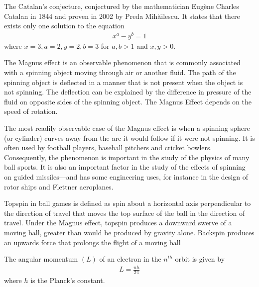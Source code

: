 \begin{mathbox}{}
{The Catalan's conjecture, conjectured by the mathematician Eugène Charles Catalan in 1844 and proven in 2002 by Preda Mihăilescu. It states that there  exists only one solution to the equation
\begin{align*} 
    x^a - y^b = 1
\end{align*} 
where $x=3, a=2, y=2, b=3$ for {$a,b > 1$} and {$x,y > 0$}.}
\end{mathbox}
\begin{phybox}{}
    {The Magnus effect is an observable phenomenon that is commonly associated with a spinning object moving through air or another fluid. The path of the spinning object is deflected in a manner that is not present when the object is not spinning. The deflection can be explained by the difference in pressure of the fluid on opposite sides of the spinning object. The Magnus Effect depends on the speed of rotation.

    The most readily observable case of the Magnus effect is when a spinning sphere (or cylinder) curves away from the arc it would follow if it were not spinning. It is often used by football players, baseball pitchers and cricket bowlers. Consequently, the phenomenon is important in the study of the physics of many ball sports. It is also an important factor in the study of the effects of spinning on guided missiles—and has some engineering uses, for instance in the design of rotor ships and Flettner aeroplanes.
    
    Topspin in ball games is defined as spin about a horizontal axis perpendicular to the direction of travel that moves the top surface of the ball in the direction of travel. Under the Magnus effect, topspin produces a downward swerve of a moving ball, greater than would be produced by gravity alone. Backspin produces an upwards force that prolongs the flight of a moving ball}
\end{phybox}
\begin{phybox}{}
{The {angular momentum} $(L)$ of an {electron} in the $n^{th}$ orbit is given by 
\begin{align*} 
    L = \frac{nh}{2\pi} 
\end{align*} where $h$ is the {Planck's constant}.}
\end{phybox}
